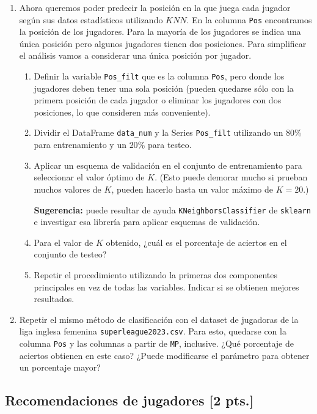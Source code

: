 \documentclass[a4paper,11pt]{article}
\theoremstyle{definition}
\begin{document}
\begin{enumerate}[resume]
\item Ahora queremos poder predecir la posición en la que juega cada jugador según sus datos estadísticos utilizando $KNN$. En la columna \lstinline{Pos} encontramos la posición de los jugadores. Para la mayoría de los jugadores se indica una \'unica posición pero algunos jugadores tienen dos posiciones. Para simplificar el análisis vamos a considerar una única posición por jugador.
\begin{enumerate}
\item Definir la variable \verb|Pos_filt| que es la columna \verb|Pos|, pero donde los jugadores deben tener una sola
posición (pueden quedarse sólo con la primera posición de cada jugador o eliminar los jugadores con dos posiciones,
lo que consideren más conveniente).
\item Dividir el DataFrame \verb|data_num| y la Series \verb|Pos_filt| utilizando un $80$\% para entrenamiento y un $20$\% para testeo.
\item Aplicar un esquema de validación en el conjunto de entrenamiento para seleccionar el valor óptimo de $K$. (Esto puede demorar mucho si prueban muchos valores de $K$, pueden hacerlo hasta un valor máximo de $K = 20$.)

\textbf{Sugerencia:} puede resultar de ayuda \verb|KNeighborsClassifier| de \verb|sklearn| e investigar
esa librería para aplicar esquemas de validación.
\item Para el valor de $K$ obtenido, ¿cuál es el porcentaje de aciertos en el conjunto de testeo?
\item Repetir el procedimiento utilizando la primeras dos componentes principales en vez de todas las variables.
Indicar si se obtienen mejores resultados.
\end{enumerate}
\item Repetir el mismo método de clasificación con el dataset de jugadoras de la liga inglesa femenina
\verb|superleague2023.csv|. Para esto, quedarse con la columna \verb|Pos| y las columnas a partir de \verb|MP|,
inclusive.
¿Qué porcentaje de aciertos obtienen en este caso? ¿Puede modificarse el parámetro para obtener un porcentaje mayor?
\end{enumerate}

\subsection*{Recomendaciones de jugadores [2 pts.]}
\end{document}
